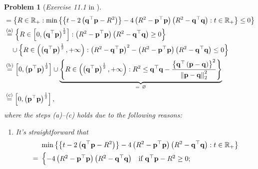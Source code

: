 \documentclass[11pt]{article}
\newtheorem{problem}{Problem}
\numberwithin{equation}{problem}
\begin{document}
\begin{problem} [\emph{Exercise 11.1} in \cite{calafiore2014optimization}]
{\begin{equation}
\begin{split}
        &= \left\{ R \in \mathbb{R}_{+} : \min \left\{
        \left\{ t - 2 \left( \mathbf{q}^{\top} \mathbf{p} - R^2 \right) \right\} - 4 \left( R^2 - \mathbf{p}^{\top} \mathbf{p} \right) \left( R^2 - \mathbf{q}^{\top} \mathbf{q} \right) : t \in \mathbb{R}_{+} \right\} \leq 0 \right\} \\
        &\stackrel{\textnormal{(a)}}{=}
        \left\{ R \in \left[ 0, \left( \mathbf{q}^{\top} \mathbf{p} \right)^{\frac{1}{2}} \right] : \left( R^2 - \mathbf{p}^{\top} \mathbf{p} \right) \left( R^2 - \mathbf{q}^{\top} \mathbf{q} \right) \geq 0 \right\} \\
        &\quad \cup \left\{ R \in \left( \left( \mathbf{q}^{\top} \mathbf{p} \right)^{\frac{1}{2}}, +\infty \right) : \left( R^2 - \mathbf{q}^{\top} \mathbf{p} \right)^2 - \left( R^2 - \mathbf{p}^{\top} \mathbf{p} \right) \left( R^2 - \mathbf{q}^{\top} \mathbf{q} \right) \leq 0 \right\} \\
        &\stackrel{\textnormal{(b)}}{=} \left[ 0, \left( \mathbf{p}^{\top} \mathbf{p} \right)^{\frac{1}{2}} \right]
        \cup \underbrace{\left\{ R \in \left( \left( \mathbf{q}^{\top} \mathbf{p} \right)^{\frac{1}{2}}, +\infty \right) : R^2 \leq \mathbf{q}^{\top} \mathbf{q}
        - \frac{\left\{ \mathbf{q}^{\top} \left( \mathbf{p} - \mathbf{q} \right) \right\}^2}{\left\| \mathbf{p} - \mathbf{q} \right\|_{2}^2} \right\}}_{= \ \varnothing} \\
        &\stackrel{\textnormal{(c)}}{=} \left[ 0, \left( \mathbf{p}^{\top} \mathbf{p} \right)^{\frac{1}{2}} \right],
    \end{split}
\end{equation}
where the steps (a)--(c) holds due to the following reasons:
\begin{enumerate} [label=(\alph*)]
    \item It's straightforward that
    \begin{equation}
        \label{eqn1.9}
        \begin{split}
            &\min \left\{
            \left\{ t - 2 \left( \mathbf{q}^{\top} \mathbf{p} - R^2 \right) \right\} - 4 \left( R^2 - \mathbf{p}^{\top} \mathbf{p} \right) \left( R^2 - \mathbf{q}^{\top} \mathbf{q} \right) : t \in \mathbb{R}_{+} \right\} \\
            = \ &
            \begin{cases}
                - 4 \left( R^2 - \mathbf{p}^{\top} \mathbf{p} \right) \left( R^2 - \mathbf{q}^{\top} \mathbf{q} \right) & \textnormal{if } \mathbf{q}^{\top} \mathbf{p} - R^2 \geq 0; \\

\end{cases}
\end{split}
\end{equation}
\end{enumerate}}
\end{problem}
\end{document}
